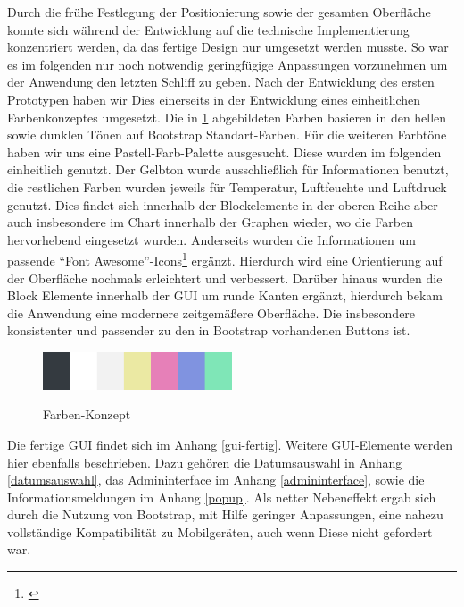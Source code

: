 Durch die frühe Festlegung der Positionierung sowie der gesamten Oberfläche konnte sich während der Entwicklung auf die technische Implementierung konzentriert werden, da das fertige Design nur umgesetzt werden musste.
So war es im folgenden nur noch notwendig geringfügige Anpassungen vorzunehmen um der Anwendung den letzten Schliff zu geben.
Nach der Entwicklung des ersten Prototypen haben wir Dies einerseits in der Entwicklung eines einheitlichen Farbenkonzeptes umgesetzt.
Die in \cref{fig:farbmuster} abgebildeten Farben basieren in den hellen sowie dunklen Tönen auf Bootstrap Standart-Farben.
Für die weiteren Farbtöne haben wir uns eine Pastell-Farb-Palette ausgesucht. Diese wurden im folgenden einheitlich genutzt.
Der Gelbton wurde ausschließlich für Informationen benutzt, die restlichen Farben wurden jeweils für Temperatur, Luftfeuchte und Luftdruck genutzt.
Dies findet sich innerhalb der Blockelemente in der oberen Reihe aber auch insbesondere im Chart innerhalb der Graphen wieder, wo die Farben hervorhebend eingesetzt wurden.
Anderseits wurden die Informationen um passende \enquote{Font Awesome}-Icons\footnote{\cite{fontawesome}} ergänzt.
Hierdurch wird eine Orientierung auf der Oberfläche nochmals erleichtert und verbessert.
Darüber hinaus wurden die Block Elemente innerhalb der GUI um runde Kanten ergänzt, hierdurch bekam die Anwendung eine modernere zeitgemäßere Oberfläche. Die insbesondere konsistenter und passender zu den in Bootstrap vorhandenen Buttons ist.
\begin{figure}[h!!]
    \centering
    \begin{minipage}[t]{1\textwidth}
        \caption{Farben-Konzept}
        \includegraphics[width=0.5\textwidth]{img/Farbmuster.png}\\
        \label{fig:farbmuster}
    \end{minipage}
\end{figure}

Die fertige GUI findet sich im Anhang \ref{gui-fertig}.
Weitere GUI-Elemente werden hier ebenfalls beschrieben.
Dazu gehören die Datumsauswahl in Anhang \ref{datumsauswahl}, das Admininterface im Anhang \ref{admininterface}, sowie die Informationsmeldungen im Anhang \ref{popup}.
Als netter Nebeneffekt ergab sich durch die Nutzung von Bootstrap, mit Hilfe geringer Anpassungen, eine nahezu vollständige Kompatibilität zu Mobilgeräten, auch wenn Diese nicht gefordert war.




